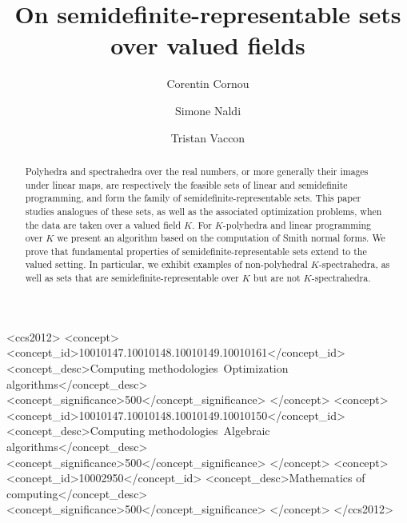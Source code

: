 \documentclass[sigconf]{acmart}
\begin{document}
\title{On semidefinite-representable sets over valued fields}

\author{Corentin Cornou}

\author{Simone Naldi}

\author{Tristan Vaccon}


\renewcommand{\shortauthors}{C. Cornou, S. Naldi and T. Vaccon}

\begin{abstract}
  Polyhedra and spectrahedra over the real numbers, or more generally
  their images under linear maps, are respectively the feasible sets
  of linear and semidefinite
  programming, and form the family of semidefinite-representable sets.
  This paper studies analogues of these sets, as well as
  the associated optimization problems, when the data are taken over a valued 
  field $K$.
  For $K$-polyhedra and linear programming over $K$ we present an algorithm
  based on the computation of Smith normal forms.
  We prove that fundamental properties of semidefinite-representable sets extend
  to the valued setting.
  In particular, we exhibit examples of non-polyhedral $K$-spectrahedra, as well as
 sets that are semidefinite-representable over $K$ but are not $K$-spectrahedra.
\end{abstract}

\begin{CCSXML}
<ccs2012>
<concept>
<concept_id>10010147.10010148.10010149.10010161</concept_id>
<concept_desc>Computing methodologies~Optimization algorithms</concept_desc>
<concept_significance>500</concept_significance>
</concept>
<concept>
<concept_id>10010147.10010148.10010149.10010150</concept_id>
<concept_desc>Computing methodologies~Algebraic algorithms</concept_desc>
<concept_significance>500</concept_significance>
</concept>
<concept>
<concept_id>10002950</concept_id>
<concept_desc>Mathematics of computing</concept_desc>
<concept_significance>500</concept_significance>
</concept>
</ccs2012>
\end{CCSXML}
\end{document}
